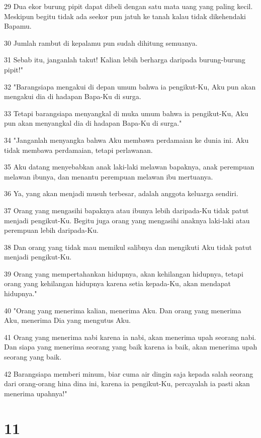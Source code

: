 \par 29 Dua ekor burung pipit dapat dibeli dengan satu mata uang yang paling kecil. Meskipun begitu tidak ada seekor pun jatuh ke tanah kalau tidak dikehendaki Bapamu.
\par 30 Jumlah rambut di kepalamu pun sudah dihitung semuanya.
\par 31 Sebab itu, janganlah takut! Kalian lebih berharga daripada burung-burung pipit!"
\par 32 "Barangsiapa mengakui di depan umum bahwa ia pengikut-Ku, Aku pun akan mengakui dia di hadapan Bapa-Ku di surga.
\par 33 Tetapi barangsiapa menyangkal di muka umum bahwa ia pengikut-Ku, Aku pun akan menyangkal dia di hadapan Bapa-Ku di surga."
\par 34 "Janganlah menyangka bahwa Aku membawa perdamaian ke dunia ini. Aku tidak membawa perdamaian, tetapi perlawanan.
\par 35 Aku datang menyebabkan anak laki-laki melawan bapaknya, anak perempuan melawan ibunya, dan menantu perempuan melawan ibu mertuanya.
\par 36 Ya, yang akan menjadi musuh terbesar, adalah anggota keluarga sendiri.
\par 37 Orang yang mengasihi bapaknya atau ibunya lebih daripada-Ku tidak patut menjadi pengikut-Ku. Begitu juga orang yang mengasihi anaknya laki-laki atau perempuan lebih daripada-Ku.
\par 38 Dan orang yang tidak mau memikul salibnya dan mengikuti Aku tidak patut menjadi pengikut-Ku.
\par 39 Orang yang mempertahankan hidupnya, akan kehilangan hidupnya, tetapi orang yang kehilangan hidupnya karena setia kepada-Ku, akan mendapat hidupnya."
\par 40 "Orang yang menerima kalian, menerima Aku. Dan orang yang menerima Aku, menerima Dia yang mengutus Aku.
\par 41 Orang yang menerima nabi karena ia nabi, akan menerima upah seorang nabi. Dan siapa yang menerima seorang yang baik karena ia baik, akan menerima upah seorang yang baik.
\par 42 Barangsiapa memberi minum, biar cuma air dingin saja kepada salah seorang dari orang-orang hina dina ini, karena ia pengikut-Ku, percayalah ia pasti akan menerima upahnya!"

\chapter{11}

